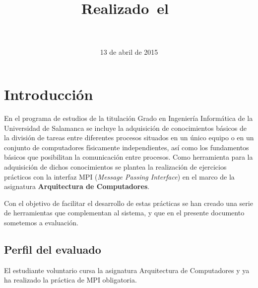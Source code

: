 \documentclass{article}
\title{
\vspace{2in}
\textmd{\textbf{\hmwkTitle}}\\
\normalsize\vspace{0.1in}\small{Realizado\ el\ \hmwkDueDate}\\
\vspace{0.1in}\large{\textit{\hmwkClassInstructor\ }}
\vspace{3in}
}
\title{\hmwkTitle}
\author{\textbf{\hmwkAuthorName}}
\date{13 de abril de 2015} %
\begin{document}
\maketitle



\newpage
\tableofcontents
\newpage



\section{Introducción}

En el programa de estudios de la titulación Grado en Ingeniería Informática de la Universidad de Salamanca se incluye la adquisición de conocimientos básicos de la división de tareas entre diferentes procesos situados en un único equipo o en un conjunto de computadores físicamente independientes, así como los fundamentos básicos que posibilitan la comunicación entre procesos. Como herramienta para la adquisición de dichos conocimientos se plantea la realización de ejercicios prácticos con la interfaz MPI (\textit{Message Passing Interface}) en el marco de la asignatura \textbf{Arquitectura de Computadores}.

Con el objetivo de facilitar el desarrollo de estas prácticas se han creado una serie de herramientas que complementan al sistema, y que en el presente documento sometemos a evaluación.

\subsection{Perfil del evaluado}

El estudiante voluntario cursa la asignatura Arquitectura de Computadores y ya ha realizado la práctica de MPI obligatoria.
\end{document}
